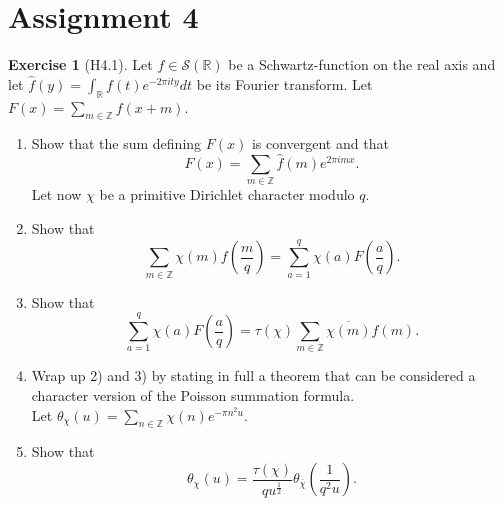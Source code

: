 \documentclass[reqno]{amsart}
\theoremstyle{definition}
\newtheorem{exercise}[theorem]{Exercise}
\theoremstyle{remark}
\begin{document}
\section{Assignment 4}

\begin{exercise}[H4.1]
    Let $f \in \mathcal{S}(\mathbb{R})$ be a 
    Schwartz-function on the real axis and
    let $\hat{f}(y)  =
    \int_{\mathbb{R}} f(t) e^{-2\pi i t y}dt$ be its
    Fourier transform. Let
    $F(x) = \sum_{m \in \mathbb{Z}}
    f(x+m)$.
    \begin{enumerate}
        \item Show that the sum defining $F(x)$ is convergent
            and that
            \[
            F(x) = \sum_{m \in \mathbb{Z}}
            \hat{f}(m) e^{2\pi i mx}.
            \] 
            Let now $\chi$ be a primitive Dirichlet character
            modulo $q$.
        \item Show that
            \[
            \sum_{m \in \mathbb{Z}}
            \chi(m) f\left( \frac{m}{q} \right) 
            = \sum_{a=1}^{q}\chi(a)
            F\left( \frac{a}{q} \right) .
            \] 
        \item Show that
            \[
            \sum_{a=1}^{q} \chi(a) F(\frac{a}{q})
            = \tau(\chi) \sum_{m \in \mathbb{Z}}
            \overline{\chi(m)} \hat{f}(m).
            \] 
        \item Wrap up 2) and 3) by stating in full a theorem
            that can be considered a character version
            of the Poisson summation formula.\\
            Let $\theta_{\chi}(u) = 
            \sum_{n \in \mathbb{Z}} \chi(n)
            e^{- \pi n^2 u}$.
        \item Show that
            \[
            \theta_{\chi}(u) = 
            \frac{\tau (\chi)}{q u^{\frac{1}{2}}}
            \theta_{\overline{\chi}} \left( \frac{1}{q^2 u} \right) .
            \] 
    \end{enumerate}
\end{exercise}
\end{document}
